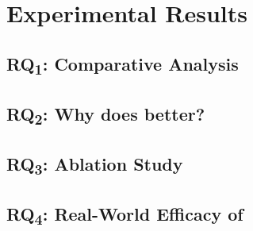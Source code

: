 \section{Experimental Results}
\subsection{\texorpdfstring{RQ\textsubscript{1}}{}: Comparative Analysis}

\subsection{\texorpdfstring{RQ\textsubscript{2}}{}: Why \tool does better?}

\subsection{\texorpdfstring{RQ\textsubscript{3}}{}: Ablation Study}

\subsection{\texorpdfstring{RQ\textsubscript{4}}{}: Real-World Efficacy of \tool}
